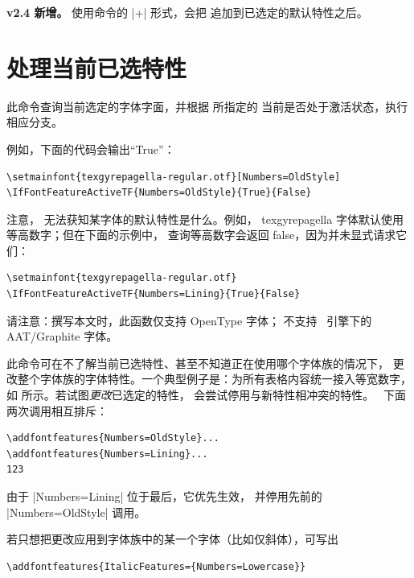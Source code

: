 \documentclass[a4paper]{l3doc}
\begin{document}

\textbf{v2.4 新增。}
使用命令的 |+| 形式，会把  追加到已选定的默认特性之后。


\section{处理当前已选特性}
\label{sec:addfontfeatures}



此命令查询当前选定的字体字面，并根据  所指定的
 当前是否处于激活状态，执行相应分支。

例如，下面的代码会输出“True”：
\begin{Verbatim}
\setmainfont{texgyrepagella-regular.otf}[Numbers=OldStyle]
\IfFontFeatureActiveTF{Numbers=OldStyle}{True}{False}
\end{Verbatim}

注意， 无法获知某字体的默认特性是什么。例如，
texgyrepagella 字体默认使用等高数字；但在下面的示例中，
查询等高数字会返回 false，因为并未显式请求它们：
\begin{Verbatim}
\setmainfont{texgyrepagella-regular.otf}
\IfFontFeatureActiveTF{Numbers=Lining}{True}{False}
\end{Verbatim}

请注意：撰写本文时，此函数仅支持 OpenType 字体；
不支持 \XeTeX\ 引擎下的 AAT/Graphite 字体。



此命令可在不了解当前已选特性、甚至不知道正在使用哪个字体族的情况下，
更改整个字体族的字体特性。一个典型例子是：为所有表格内容统一接入等宽数字，
如  所示。若试图\emph{更改}已选定的特性，
 会尝试停用与新特性相冲突的特性。
\Eg\ 下面两次调用相互排斥：
\begin{Verbatim}
\addfontfeatures{Numbers=OldStyle}...
\addfontfeatures{Numbers=Lining}...
123
\end{Verbatim}
由于 |Numbers=Lining| 位于最后，它优先生效，
并停用先前的 |Numbers=OldStyle| 调用。

若只想把更改应用到字体族中的某一个字体（比如仅斜体），可写出
\begin{Verbatim}
\addfontfeatures{ItalicFeatures={Numbers=Lowercase}}
\end{Verbatim}
\end{document}
